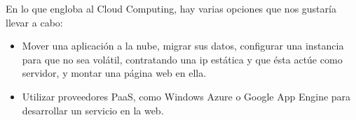 \documentclass[runningheads]{llncs}
\begin{document}
En lo que engloba al Cloud Computing, hay varias opciones que nos gustaría llevar a cabo:

\begin{itemize}
 \item Mover una aplicación a la nube, migrar sus datos, configurar una  instancia para que no sea volátil, contratando una ip estática  y que 
 ésta actúe como servidor, y montar una página web en ella. 
 \item Utilizar proveedores PaaS, como Windows Azure o Google App Engine para desarrollar un servicio en la web. 
\end{itemize}




\end{document}
